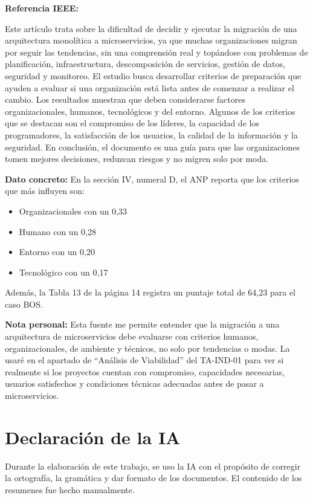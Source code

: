 \documentclass[12pt,a4paper]{article}
\begin{document}
\textbf{Referencia IEEE:} 

Este artículo trata sobre la dificultad de decidir y ejecutar la migración de una arquitectura monolítica a microservicios, ya que muchas organizaciones migran por seguir las tendencias, sin una comprensión real y topándose con problemas de planificación, infraestructura, descomposición de servicios, gestión de datos, seguridad y monitoreo. El estudio busca desarrollar criterios de preparación que ayuden a evaluar si una organización está lista antes de comenzar a realizar el cambio. Los resultados muestran que deben considerarse factores organizacionales, humanos, tecnológicos y del entorno. Algunos de los criterios que se destacan son el compromiso de los líderes, la capacidad de los programadores, la satisfacción de los usuarios, la calidad de la información y la seguridad. En conclusión, el documento es una guía para que las organizaciones tomen mejores decisiones, reduzcan riesgos y no migren solo por moda.

\textbf{Dato concreto:} En la sección IV, numeral D, el ANP reporta que los criterios que más influyen son:

\begin{itemize}
    \item Organizacionales con un 0,33
    \item Humano con un 0,28
    \item Entorno con un 0,20
    \item Tecnológico con un 0,17
\end{itemize}

Además, la Tabla 13 de la página 14 registra un puntaje total de 64,23 para el caso BOS.

\textbf{Nota personal:} Esta fuente me permite entender que la migración a una arquitectura de microservicios debe evaluarse con criterios humanos, organizacionales, de ambiente y técnicos, no solo por tendencias o modas. La usaré en el apartado de ``Análisis de Viabilidad'' del TA-IND-01 para ver si realmente si los proyectos cuentan con compromiso, capacidades necesarias, usuarios satisfechos y condiciones técnicas adecuadas antes de pasar a microservicios.

\section*{Declaración de la IA}

Durante la elaboración de este trabajo, se uso la IA con el propósito de corregir la ortografía, la gramática y dar formato de los documentos. El contenido de los resumenes fue hecho manualmente.

\printbibliography
\end{document}
